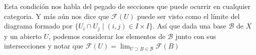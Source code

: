 \documentclass[14pt]{extarticle}
\begin{document}
Esta condición nos habla del pegado de secciones
que puede ocurrir en cualquier categoria. Y más aún
nos dice que $\mathcal{F}(U)$ puede ser visto como 
el límite del diagrama formado por $\{U_i\cap U_j\mid (i,j)\in I\times I\}$.
Así que dada una base $\mathcal{B}$ de $X$ y un abierto $U$,
podemos considerar los elementos de $\mathcal{B}$ junto con sus intersecciones
y notar que $\mathcal{F}(U)=\lim_{U\supset B\in \mathcal{B}} \mathcal{F}(B)$
\end{document}
